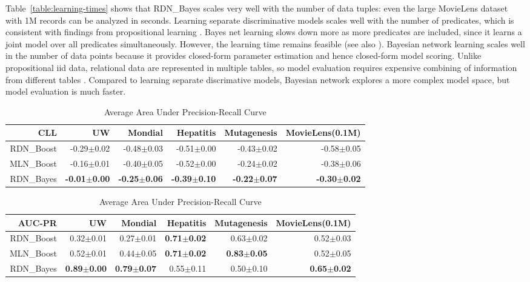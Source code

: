 \documentclass[runningheads,a4paper]{llncs}
\begin{document}
Table~\ref{table:learning-times} shows that RDN\_Bayes scales very well with the number of data tuples: even the large MovieLens dataset with 1M records can be analyzed in seconds. Learning separate discriminative models  scales well with the number of predicates, which is consistent with findings from  propositional learning \cite{Heckerman2000,Hulten2003}. Bayes net learning slows down more as more predicates are included, since it learns a joint model over all predicates simultaneously. However, the learning time remains feasible (see also \cite{Schulte2012}). Bayesian network learning scales well in the number of data points because it provides closed-form parameter estimation and hence closed-form model scoring. Unlike propositional iid data, relational data are represented in multiple tables, so model evaluation requires expensive combining of information from different tables \cite{Neville2007}. Compared to learning separate discrimative models, Bayesian network explores a more complex model space, but  model evaluation is much faster. 
\begin{table}[htbp]
 \centering
  \caption{Average Conditional Log-Likelihood. \textbf{Zhensong: please make chart as in presentation.}}
    \begin{tabular}{|r|r|r|r|r|r|} \hline
    \textbf{CLL} & UW    & Mondial  & Hepatitis & Mutagenesis  & MovieLens(0.1M) \\ \hline
   RDN\_Boost & -0.29$\pm$0.02 & -0.48$\pm$0.03 & -0.51$\pm$0.00 & -0.43$\pm$0.02 & -0.58$\pm$0.05 \\
    MLN\_Boost & -0.16$\pm$0.01 & -0.40$\pm$0.05 & -0.52$\pm$0.00 & -0.24$\pm$0.02 & -0.38$\pm$0.06 \\
    RDN\_Bayes & \textbf{-0.01$\pm$0.00} & \textbf{-0.25$\pm$0.06} & \textbf{-0.39$\pm$0.10} & \textbf{-0.22$\pm$0.07} & \textbf{-0.30$\pm$0.02} \\ \hline
    \end{tabular}%
  \label{table:cll}%

 \centering 
 \vspace{0.1cm}
 \caption{Average Area Under Precision-Recall Curve}
    \begin{tabular}{|r|r|r|r|r|r|} \hline
    \textbf{AUC-PR} & UW    & Mondial  & Hepatitis & Mutagenesis  & MovieLens(0.1M) \\ \hline
    RDN\_Boost & 0.32$\pm$0.01 & 0.27$\pm$0.01 & \textbf{0.71$\pm$0.02} & 0.63$\pm$0.02 & 0.52$\pm$0.03 \\
    MLN\_Boost & 0.52$\pm$0.01 & 0.44$\pm$0.05 & \textbf{0.71$\pm$0.02} & \textbf{0.83$\pm$0.05} & 0.52$\pm$0.05 \\
    RDN\_Bayes & \textbf{0.89$\pm$0.00} & \textbf{0.79$\pm$0.07} & 0.55$\pm$0.11 & 0.50$\pm$0.10 & \textbf{0.65$\pm$0.02} \\ \hline
    \end{tabular}%
  \label{table:AUC}%
\end{table}%
\end{document}
